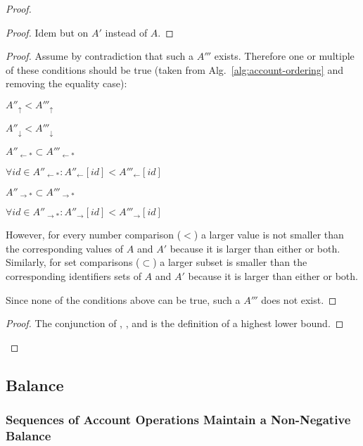 \documentclass[9pt, oneside]{article}   	%
\begin{document}
\begin{proof}
	\begin{proof}
		Idem  but on $A'$ instead of $A$.
	\end{proof}
	
	\begin{proof}
		Assume by contradiction that such a $A'''$ exists. Therefore one or multiple of these conditions should be true (taken from Alg.~\ref{alg:account-ordering} and removing the equality case):
		\begin{pfenum}
			\item $A''_\uparrow < A'''_\uparrow$
			\item $A''_\downarrow < A'''_\downarrow$
			\item $A''_{\leftarrow *} \subset A'''_{\leftarrow *}$
			\item $\forall id \in A''_{\leftarrow *} : A''_{\leftarrow}[id] < A'''_{\leftarrow}[id] $
			\item $A''_{\rightarrow *} \subset A'''_{\rightarrow *}$  
			\item $\forall id \in A''_{\rightarrow *} : A''_{\rightarrow}[id] < A'''_{\rightarrow}[id] $
		\end{pfenum}
		However, for every number comparison ($<$) a larger value is not smaller than the corresponding values of $A$ and $A'$ because it is larger than either or both. Similarly, for set comparisons ($\subset$) a larger subset is smaller than the corresponding identifiers sets of $A$ and $A'$ because it is larger than either or both.
		
		Since none of the conditions above can be true, such a $A'''$ does not exist.
	\end{proof}
	
	\qedstep
	\begin{proof}
		The conjunction of , , and  is the definition of a highest lower bound.
	\end{proof}
\end{proof}



\subsection{Balance}
\label{sec:proof:balance}


\subsubsection{Sequences of Account Operations Maintain a Non-Negative Balance}
\end{document}
